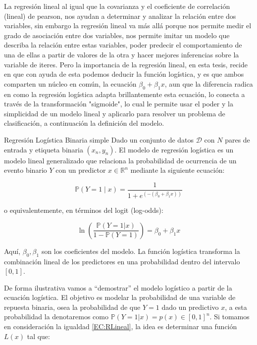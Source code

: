 La regresión lineal al igual que la covarianza y el coeficiente de correlación (lineal) de pearson, nos ayudan a determinar y analizar la relación entre dos variables, sin embargo la regresión lineal va más allá porque nos permite medir el grado de asociación entre dos variables, nos permite imitar un modelo que describa la relación entre estas variables, poder predecir el comportamiento de una de ellas a partir de valores de la otra y hacer mejores inferencias sobre la variable de iteres. Pero la importancia de la regresión lineal, en esta tesis, recide en que con ayuda de esta podemos deducir la función logística, y es que ambos comparten un núcleo en común, la ecuación $\beta_0 +\beta_1 x$, aun que la diferencia radica en como la regresión logística adapta brillantemente esta ecuación, lo conecta a través de la transformación "sigmoide", lo cual le permite usar el poder y la simplicidad de un modelo lineal y aplicarlo para resolver un problema de clasificación, a continuación la definición del modelo.



\begin{definicion}{Regresión Logística Binaria simple}
	Dado un conjunto de datos $\mathcal{D}$ con $N$ pares de entrada y etiqueta binaria $(x_n,y_n)$. El modelo de regresión logística es un modelo lineal generalizado que relaciona la probabilidad de ocurrencia de un evento binario \( Y  \) con un predictor $x\in \mathbb{R}^n$ mediante la siguiente ecuación:
	
	\[
	\mathbb{P}(Y = 1 \mid x) = \frac{1}{1 + e^{\left( - (\beta_0 + \beta_1 x) \right)}}
	\]
	
	o equivalentemente, en términos del logit (log-odds):
	
	\[
	\ln\left( \frac{\mathbb{P}(Y = 1|x)}{1 - \mathbb{P}(Y = 1)} \right) = \beta_0 + \beta_1 x
	\]
	
	Aquí, \( \beta_0, \beta_1\) son los coeficientes del modelo. La función logística transforma la combinación lineal de los predictores en una probabilidad dentro del intervalo $[0, 1]$.
\end{definicion}

De forma ilustrativa vamos a ``demostrar'' el modelo logístico a partir de la ecuación logística. El objetivo es modelar la probabilidad de una variable de repuesta binaria, osea la probabilidad de que $Y=1$ dado un predictivo $x$, a esta probabilidad la denotaremos como $\mathbb{P}(Y=1|x)=p(x)\in [0,1]^n$. Si tomamos en consideración la igualdad \eqref{EC:RLineal}, la idea es determinar una función $L(x)$ tal que:


